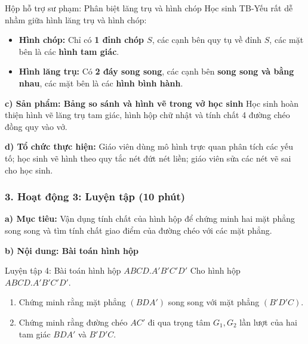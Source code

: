 \documentclass[12pt, a4paper]{article}
\begin{document}
\begin{scaffoldbox}{Hộp hỗ trợ sư phạm: Phân biệt lăng trụ và hình chóp}
Học sinh TB-Yếu rất dễ nhầm giữa hình lăng trụ và hình chóp:
\begin{itemize}[leftmargin=0.6cm]
    \item \textbf{Hình chóp:} Chỉ có \textbf{1 đỉnh chóp $S$}, các cạnh bên quy tụ về đỉnh $S$, các mặt bên là các \textbf{hình tam giác}.
    \item \textbf{Hình lăng trụ:} Có \textbf{2 đáy song song}, các cạnh bên \textbf{song song và bằng nhau}, các mặt bên là các \textbf{hình bình hành}.
\end{itemize}
\end{scaffoldbox}

\noindent \textbf{c) Sản phẩm: Bảng so sánh và hình vẽ trong vở học sinh}
Học sinh hoàn thiện hình vẽ lăng trụ tam giác, hình hộp chữ nhật và tính chất 4 đường chéo đồng quy vào vở.

\noindent \textbf{d) Tổ chức thực hiện:}
Giáo viên dùng mô hình trực quan phân tích các yếu tố; học sinh vẽ hình theo quy tắc nét đứt nét liền; giáo viên sửa các nét vẽ sai cho học sinh.

\subsubsection*{3. Hoạt động 3: Luyện tập (10 phút)}

\noindent \textbf{a) Mục tiêu:}
Vận dụng tính chất của hình hộp để chứng minh hai mặt phẳng song song và tìm tính chất giao điểm của đường chéo với các mặt phẳng.

\noindent \textbf{b) Nội dung: Bài toán hình hộp}
\begin{pedabox}{Luyện tập 4: Bài toán hình hộp $ABCD.A'B'C'D'$}
Cho hình hộp $ABCD.A'B'C'D'$.
\begin{enumerate}[leftmargin=0.6cm]
    \item Chứng minh rằng mặt phẳng $(BDA')$ song song với mặt phẳng $(B'D'C)$.
    \item Chứng minh rằng đường chéo $AC'$ đi qua trọng tâm $G_1, G_2$ lần lượt của hai tam giác $BDA'$ và $B'D'C$.
\end{enumerate}
\end{pedabox}
\end{document}
